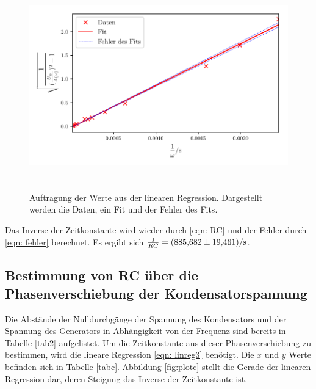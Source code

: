 \begin{figure}
  \centering
  \includegraphics[width=13cm, height=9cm]{build/plotb.pdf}
  \caption{Auftragung der Werte aus der linearen Regression. Dargestellt werden die Daten, ein Fit und der Fehler des Fits.}
  \label{fig:plotb}
\end{figure}

\noindent Das Inverse der Zeitkonstante wird wieder durch \eqref{eqn: RC} und der Fehler durch \eqref{eqn: fehler}
berechnet. Es ergibt sich $\frac{1}{RC} = \SI{885.682  \pm 19.461}{\per\second}$.

\subsection{Bestimmung von RC über die Phasenverschiebung der Kondensatorspannung}
\label{sec: c}
Die Abstände der Nulldurchgänge der Spannung des Kondensators und der Spannung des Generators in Abhängigkeit
von der Frequenz sind bereits in Tabelle \ref{tab2} aufgelistet.
Um die Zeitkonstante aus dieser Phasenverschiebung zu bestimmen, wird die lineare Regression \eqref{eqn: linreg3} benötigt.
Die $x$ und $y$ Werte befinden sich in Tabelle \ref{tabc}. Abbildung \ref{fig:plotc} stellt die Gerade der
linearen Regression dar, deren Steigung das Inverse der Zeitkonstante ist.


